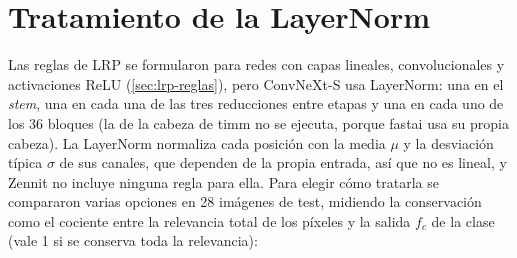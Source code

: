 \section{Tratamiento de la LayerNorm}\label{sec:xai-layernorm}

Las reglas de LRP se formularon para redes con capas lineales, convolucionales y activaciones ReLU
(\cref{sec:lrp-reglas}), pero ConvNeXt-S usa LayerNorm: una en el \emph{stem}, una en cada una de las
tres reducciones entre etapas y una en cada uno de los 36 bloques (la de la cabeza de timm no se
ejecuta, porque fastai usa su propia cabeza). La LayerNorm normaliza cada posición con la media
$\mu$ y la desviación típica $\sigma$ de sus canales, que dependen de la propia entrada, así que no
es lineal, y Zennit no incluye ninguna regla para ella. Para elegir cómo tratarla se compararon
varias opciones en 28 imágenes de test, midiendo la conservación como el cociente entre la relevancia
total de los píxeles y la salida $f_c$ de la clase (vale 1 si se conserva toda la relevancia):
